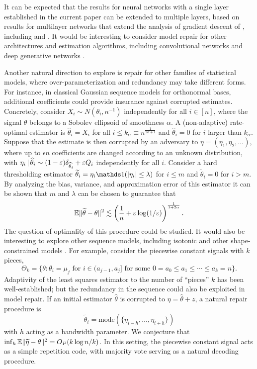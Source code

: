 It can be expected that the results for neural networks with a single layer established in the current paper
can be extended to multiple layers, based on results for multilayer networks that extend the analysis of gradient descent
of \cite{du2018gradient}, including \cite{zhuli} and \cite{dulee}. It would be interesting to
consider model repair for other architectures and estimation algorithms, including convolutional networks
and deep generative networks \citep{goodfellow2014generative,nvp,glow}.

Another natural direction to explore is repair for other families of statistical models, where over-parameterization and redundancy may take different forms. For instance, in classical Gaussian sequence models for orthonormal bases, additional coefficients could provide insurance against corrupted estimates. Concretely,
consider $X_i \sim N(\theta_i, n^{-1})$ independently for all $i\in [n]$, where the signal
$\theta$ belongs to a Sobolev ellipsoid of smoothness $\alpha$. A (non-adaptive) rate-optimal
estimator is $\hat\theta_i = X_i$ for all $i\leq k_\alpha \equiv n^{\frac{1}{2\alpha+1}}$ and $\hat\theta_i = 0$ for $i$ larger than $k_\alpha$.
Suppose that the estimate is then corrupted by an adversary to
$\eta = (\eta_1, \eta_2, \ldots)$, where up to $\epsilon n$ coefficients are changed according to an unknown distribution, with $\eta_i \,|\, \widehat\theta_i \sim (1-\varepsilon ) \delta_{\widehat\theta_i} + \varepsilon Q_i$
independently for all $i$. Consider a hard thresholding estimator $\tilde\theta_i = \eta_i \ones(|\eta_i| \leq \lambda)$ for $i \leq m$ and $\tilde \theta_i = 0$ for $i > m$.  By analyzing the bias, variance, and approximation error of this estimator it can be shown that $m$ and $\lambda$ can be chosen to guarantee that
$$ \mathbb{E} \| \widetilde\theta - \theta\|^2 \lesssim \left(\frac{1}{n} + \varepsilon \log (1/\varepsilon) \right)^{\frac{1}{1+2\alpha}}.$$
The question of optimality of this procedure could be studied. It would also be interesting
to explore other sequence models, including isotonic and other shape-constrained models
\citep{chatterjee2015risk,Chat14,unimodal}. For example, consider the piecewise constant signals with $k$ pieces,
$$\Theta_k  = \{\theta : \mbox{$\theta_i = \mu_j$ for $i\in (a_{j-1}, a_j]$ for
some $0=a_0 \leq a_1\leq \cdots \leq a_k=n$}\}.$$
Adaptivity of the least squares estimator to the number of ``pieces'' $k$  has been well-established; but
the redundancy in the sequence could also be exploited in model repair. If an initial estimator $\hat \theta$ is
corrupted to $\eta = \hat\theta + z$, a natural repair procedure is
$$\tilde \theta_i = \text{mode}(\{\eta_{i-h},\ldots,\eta_{i+h}\})$$
with $h$ acting as a bandwidth parameter. We conjecture that
$\inf_h \mathbb{E}\|\widetilde\eta -\theta\|^2 = O_P(k \log n/k)$. In this setting,
the piecewise constant signal acts as a simple repetition code, with majority vote
serving as a natural decoding procedure.

